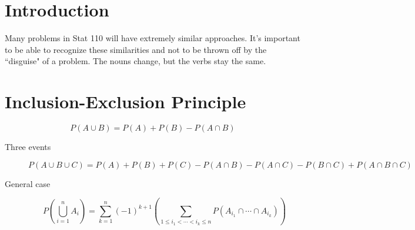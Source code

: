 \documentclass{article}
\begin{document}
 

\header

\section{Introduction}

Many problems in Stat 110 will have extremely similar approaches. It's important to be able to recognize these similarities and not to be thrown off by the ``disguise" of a problem. The nouns change, but the verbs stay the same.

\section{Inclusion-Exclusion Principle} 

$$P(A \cup B) = P(A) + P(B) - P(A \cap B)$$

\begin{description}
    \item[Three events] $P(A \cup B \cup C) = P(A) + P(B) + P(C) - P(A \cap B) - P(A \cap C) - P(B \cap C) + P(A \cap B \cap C)$
    
    \item[General case] $$P\left(\bigcup_{i=1}^n A_i\right) = \sum_{k = 1}^n (-1)^{k+1} \left( \sum_{1 \leq i_1 < \cdots < i_k \leq n} P( A_{i_1} \cap \cdots \cap A_{i_k} ) \right)$$
\end{description}



\end{document}

